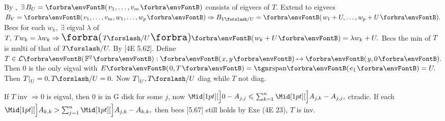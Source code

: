
By , $\exists\,B_U=\Par{v_1,\dots,v_m}$ consists of eigvecs of $T.$\parSol{}
Extend to eigvecs $B_V=\Par{v_1,\dots,v_m,w_1,\dots,w_p}\Rightarrow B_{V\XSlash U}=\Par{w_1+U,\dots,w_p+U}.$\parSol{}
Becs for each $w_k,\:\exists$ eigval $\lambda$ of $T,\:Tw_k=\lambda w_k\Rightarrow\BigPar{T\XSlash U}\Par{w_k+U}=\lambda w_k+U.$\PfEnd\vspace{2pt}\parSol{}
\Or Becs the min of $T$ is multi of that of $T\XSlash U.$ By [4E 5.62].\PfEnd\vspace{2pt}
\AExa Define $T\in\Lm{\Fbb^2}:\Par{x,y}\mapsto\Par{y,0}.$ Then $0$ is the only eigval with $E\Par{0,T}=\Span{e_1}=U.$\parExa
Then $T\mmid_U=0,T\XSlash U=0.$ \;Now $T\mmid_U,T\XSlash U$ diag while $T$ not diag.\PfEnd
\SepLine


If $T$ inv $\Rightarrow 0$ is eigval, then $0$ is in G disk for some $j$, now $\aXMid{0-A_{j,j}}\leqslant\sum_{k=1}^n\aXMid{A_{j,k}}-A_{j,j},$ ctradic.\PfEnd\vspace{2pt}
\AComm If each $\aXMid{A_{k,k}}>\sum_{j=1}^n\aXMid{A_{j,k}}-A_{k,k},$ then becs [5.67] still holds by Exe (4E 23), $T$ is inv.
\SepLine

